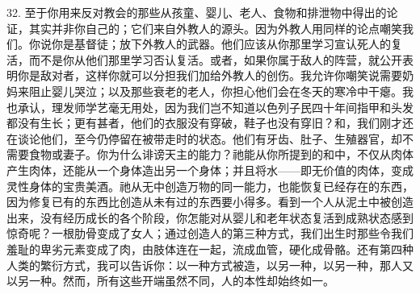 32. 至于你用来反对教会的那些从孩童、婴儿、老人、食物和排泄物中得出的论证，其实并非你自己的；它们来自外教人的源头。因为外教人用同样的论点嘲笑我们。你说你是基督徒；放下外教人的武器。他们应该从你那里学习宣认死人的复活，而不是你从他们那里学习否认复活。或者，如果你属于敌人的阵营，就公开表明你是敌对者，这样你就可以分担我们加给外教人的创伤。我允许你嘲笑说需要奶妈来阻止婴儿哭泣；以及那些衰老的老人，你担心他们会在冬天的寒冷中干瘪。我也承认，理发师学艺毫无用处，因为我们岂不知道以色列子民四十年间指甲和头发都没有生长；更有甚者，他们的衣服没有穿破，鞋子也没有穿旧？和，我们刚才还在谈论他们，至今仍停留在被带走时的状态。他们有牙齿、肚子、生殖器官，却不需要食物或妻子。你为什么诽谤天主的能力？祂能从你所提到的和中，不仅从肉体产生肉体，还能从一个身体造出另一个身体；并且将水——即无价值的肉体，变成灵性身体的宝贵美酒。祂从无中创造万物的同一能力，也能恢复已经存在的东西，因为修复已有的东西比创造从未有过的东西要小得多。看到一个人从泥土中被创造出来，没有经历成长的各个阶段，你怎能对从婴儿和老年状态复活到成熟状态感到惊奇呢？一根肋骨变成了女人；通过创造人的第三种方式，我们出生时那些令我们羞耻的卑劣元素变成了肉，由肢体连在一起，流成血管，硬化成骨骼。还有第四种人类的繁衍方式，我可以告诉你：以一种方式被造，以另一种，以另一种，那人又以另一种。然而，所有这些开端虽然不同，人的本性却始终如一。\par

